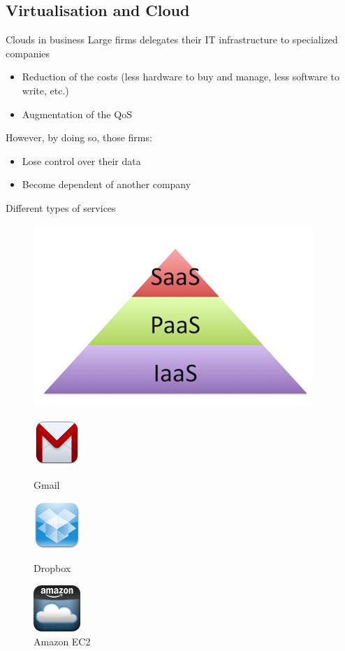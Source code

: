 \documentclass{beamer}
\begin{document}
\subsection{Virtualisation and Cloud}
\begin{frame}{Clouds in business}
Large firms delegates their IT infrastructure to specialized companies
\begin{itemize}
	\item Reduction of the costs (less hardware to buy and manage,
		less software to write, etc.)
	\item Augmentation of the QoS
\end{itemize}
 However, by doing so, those firms:
\begin{itemize}
	\item Lose control over their data
	\item Become dependent of another company
\end{itemize}
\end{frame}

\begin{frame}{Different types of services}
\begin{center}
\begin{figure}[!ht]
	\centering
	\includegraphics[scale=.45]{imgs/cloud-pyramid.png}
\end{figure}

\begin{figure}[!htb]
  \includegraphics[width=50pt]{imgs/gmail.png}
  \caption{Gmail}
\endminipage\hfill
{}
  \includegraphics[width=50pt]{imgs/dropbox.png}
  \caption{Dropbox}
\endminipage\hfill
{}%
  \includegraphics[width=50pt]{imgs/amazon.png}
  \caption{Amazon EC2}
\endminipage
\end{figure}
\end{center}
\end{frame}
\end{document}
